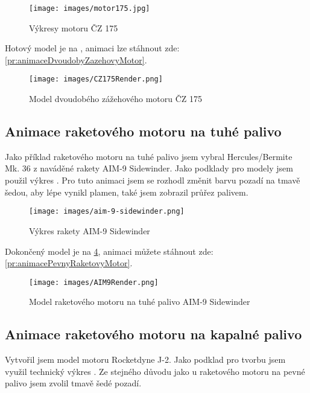 \begin{figure}[H]
    \centering
    \texttt{[image: images/motor175.jpg]}
    \caption{Výkresy motoru ČZ 175}
    \label{obr:CZ175Vykres}
\end{figure}

{Hotový model je na , animaci lze stáhnout zde: \ref{pr:animaceDvoudobyZazehovyMotor}.}

\begin{figure}[H]
    \centering
    \texttt{[image: images/CZ175Render.png]}
    \caption{Model dvoudobého zážehového motoru ČZ 175 \jaObr}
    \label{obr:CZ175Render}
\end{figure}

\newpage

\subsection{Animace raketového motoru na tuhé palivo}
{Jako příklad raketového motoru na tuhé palivo jsem vybral Hercules/Bermite Mk. 36 z naváděné rakety AIM-9 Sidewinder. Jako podklady pro modely jsem použil výkres . Pro tuto animaci jsem se rozhodl změnit barvu pozadí na tmavě šedou, aby lépe vynikl plamen, také jsem zobrazil průřez palivem.}
\cite{TB:AIM9Sidewinder}

\begin{figure}[H]
    \centering
    \texttt{[image: images/aim-9-sidewinder.png]}
    \caption{Výkres rakety AIM-9 Sidewinder}
    \label{obr:AIM9vykres}
\end{figure}

{Dokončený model je na \ref{obr:AIM9Render}, animaci můžete stáhnout zde: \ref{pr:animacePevnyRaketovyMotor}.}

\begin{figure}[H]
    \centering
    \texttt{[image: images/AIM9Render.png]}
    \caption{Model raketového motoru na tuhé palivo AIM-9 Sidewinder \jaObr}
    \label{obr:AIM9Render}
\end{figure}

\newpage

\subsection{Animace raketového motoru na kapalné palivo}
{Vytvořil jsem model motoru Rocketdyne J-2. Jako podklad pro tvorbu jsem využil technický výkres . Ze stejného důvodu jako u raketového motoru na pevné palivo jsem zvolil tmavě šedé pozadí.}
\cite{HR:F1RocketEngine}

